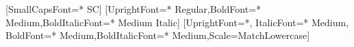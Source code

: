 \ifXeTeX
    \usepackage{fontspec}


    \setmainfont{Alegreya}[SmallCapsFont={* SC}]
    \setsansfont{Avenir Next}[UprightFont={* Regular},BoldFont={* Medium},BoldItalicFont={* Medium Italic}]
    \setmonofont{Fira Code}[UprightFont={*}, ItalicFont={* Medium}, BoldFont={* Medium},BoldItalicFont={* Medium},Scale=MatchLowercase]



\else
    \usepackage{fourier}
\fi
